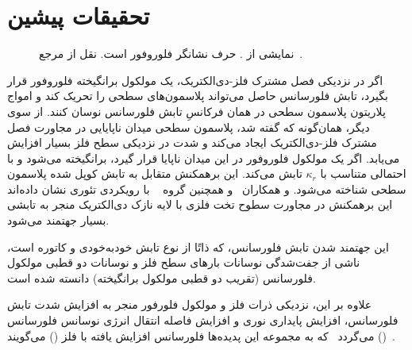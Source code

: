 \section{تحقیقات پیشین}
\begin{figure}[tb]%
	\caption{نمایشی از . حرف  نشانگر فلوروفور است. نقل از مرجع~\cite{calander2004theory}.}\label{fig:3}
\end{figure}
اگر در نزدیکی فصل مشترک فلز-دی‌الکتریک، یک مولکول برانگیخته فلوروفور قرار بگیرد، تابش فلورسانس حاصل می‌تواند پلاسمون‌های سطحی را تحریک کند و امواج پلاریتون پلاسمون سطحی در همان فرکانسِ تابش فلورسانس نوسان کنند. از سوی دیگر، همان‌گونه که گفته شد، پلاسمون سطحی میدان ناپایایی در مجاورت فصل مشترک فلز-دی‌الکتریک ایجاد می‌کند و شدت در نزدیکی سطح فلز بسیار افزایش می‌یابد. اگر یک مولکول فلوروفور در این میدان ناپایا قرار گیرد، برانگیخته می‌شود و با احتمالی متناسب با $\kappa_r$ تابش می‌کند. این برهمکنش متقابل به تابش کوپل شده پلاسمون سطحی  شناخته می‌شود.  و همکاران~\cite{calander2004theory} و همچنین گروه ~\cite{ekgasit2004evanescent,vasilev2004fluorescence} با رویکردی تئوری نشان داده‌اند این برهمکنش در مجاورت سطوح تخت فلزی با لایه نازک دی‌الکتریک منجر به تابشی بسیار جهتمند می‌شود. 

این جهتمند شدن تابش فلورسانس، که ذاتًا از نوع تابش خودبه‌خودی و کاتوره است، ناشی از جفت‌شدگی نوسانات بارهای سطح فلز و نوسانات دو قطبی مولکول فلورسانس (تقریب دو قطبی مولکول برانگیخته) دانسته شده است.


علاوه بر این، نزدیکی ذرات فلز و مولکول فلورفور منجر به افزایش شدت تابش فلورسانس، افزایش پایداری نوری و افزایش فاصله انتقال انرژی نوسانس فلورسانس () می‌گردد~\cite{Selvin2000} که به مجموعه این پدیده‌ها فلورسانس افزایش یافته با فلز () می‌گویند~\cite{ribeiro2017artefact}.


